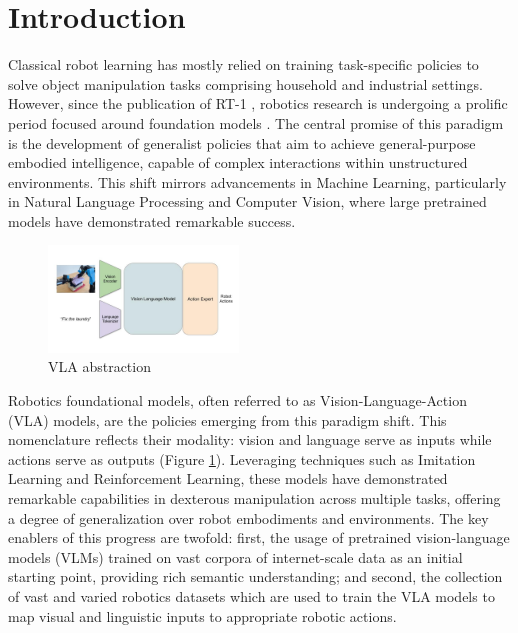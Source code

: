\section{Introduction}

Classical robot learning has mostly relied on training task-specific policies to solve object manipulation tasks comprising household and industrial settings. However, since the publication of RT-1 \cite{RT-1}, robotics research is undergoing a prolific period focused around foundation models \cite{FoundationalModels}. The central promise of this paradigm is the development of generalist policies that aim to achieve general-purpose embodied intelligence, capable of complex interactions within unstructured environments. This shift mirrors advancements in Machine Learning, particularly in Natural Language Processing and Computer Vision, where large pretrained models have demonstrated remarkable success.

\begin{figure}
    \vspace{-15pt}
    \centering
    \includegraphics[width=0.45\textwidth]{images/vla.jpg}
    \caption{VLA abstraction}
    \label{fig:vla_abstraction}
    \vspace{-15pt}
\end{figure}

Robotics foundational models, often referred to as Vision-Language-Action (VLA) models, are the policies 
emerging from this paradigm shift. This nomenclature reflects their modality: vision and language serve as inputs while 
actions serve as outputs (Figure \ref{fig:vla_abstraction}). Leveraging techniques such as Imitation Learning and 
Reinforcement Learning, these models have demonstrated remarkable capabilities in dexterous manipulation across multiple tasks, 
offering a degree of generalization over robot embodiments and environments. The key enablers of this progress are twofold: 
first, the usage of pretrained vision-language models (VLMs) trained on vast corpora of internet-scale data as an initial 
starting point, providing rich semantic understanding; and second, the collection of vast and varied robotics datasets 
which are used to train the VLA models to map visual and linguistic inputs to appropriate robotic actions.

